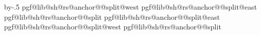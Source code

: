 {{                            \advance\pgf@ya by-.5\pgflinewidth%
                            \expandafter\pgfextract@process\csname pgf@lib@sh@rs@anchor@\pgf@lib@sh@rs@number @split@west\endcsname{%
                                \southwest%
                                \pgf@y=\pgf@ya%
                            }%
                            \expandafter\pgfextract@process\csname pgf@lib@sh@rs@anchor@\pgf@lib@sh@rs@number @split@east\endcsname{%
                                \northeast%
                                \pgf@y=\pgf@ya%
                            }%
                            \expandafter\pgfextract@process\csname pgf@lib@sh@rs@anchor@\pgf@lib@sh@rs@number @split\endcsname{%
                                \centerpoint%
                                \pgf@y=\pgf@ya%
                            }%
                            \expandafter\addtosavedmacro\csname pgf@lib@sh@rs@anchor@\pgf@lib@sh@rs@number @split@east\endcsname%
                            \expandafter\addtosavedmacro\csname pgf@lib@sh@rs@anchor@\pgf@lib@sh@rs@number @split@west\endcsname%
                            \expandafter\addtosavedmacro\csname pgf@lib@sh@rs@anchor@\pgf@lib@sh@rs@number @split\endcsname%
                        \fi%
                    \fi%
            \repeatpgfmathloop%
        \fi%
    }%
    \savedanchor\basepoint{%
        \pgf@x=0.5\wd\pgfnodeparttextbox%
        \pgf@y=0pt\relax%
    }%
    \savedanchor\midpoint{%
        \pgf@x=0.5\wd\pgfnodeparttextbox%
        \pgfmathsetlength\pgf@y{+0.5ex}%
    }%
    }
